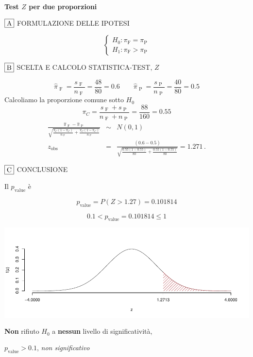 \documentclass[
  11pt,
]{book}
\theoremstyle{mytheoremstyle}
\theoremstyle{mydefstyle}
\newenvironment{sol}
  {
  \begin{tcolorbox}[enhanced,breakable,arc=0.1mm,boxrule=1pt,colback=white,colframe=iblue,
  title=\bf \fontfamily{lmss}\selectfont \hspace{.5 cm} Soluzione,drop fuzzy shadow]

}{
\end{tcolorbox}
  }
\begin{document}
\begin{sol}
\textbf{Test \(Z\) per due proporzioni}

\(\fbox{A}\) FORMULAZIONE DELLE IPOTESI

\[\begin{cases}
   H_0: \pi_\text{F} = \pi_\text{P} \\
   H_1: \pi_\text{F} > \pi_\text{P} 
   \end{cases}\]

\(\fbox{B}\) SCELTA E CALCOLO STATISTICA-TEST, \(Z\)

\[\hat\pi_\text{ F }=\frac{s_\text{ F }}{n_\text{ F }}=\frac{ 48 }{ 80 }= 0.6 \qquad
   \hat\pi_\text{ P }=\frac{s_\text{ P }}{n_\text{ P }}=\frac{ 40 }{ 80 }= 0.5 \]Calcoliamo la proporzione comune sotto \(H_0\)
\[
     \pi_C=\frac{s_\text{ F }+s_\text{ P }}{n_\text{ F }+n_\text{ P }}=
     \frac{ 88 }{ 160 }= 0.55 
   \]\begin{eqnarray*}
   \frac{\hat\pi_\text{ F } - \hat\pi_\text{ P }}
   {\sqrt{\frac {\pi_C(1-\pi_C)}{n_\text{ F }}+\frac {\pi_C(1-\pi_C)}{n_\text{ P }}}}&\sim&N(0,1)\\
   z_{\text{obs}}
   &=& \frac{ ( 0.6 -  0.5 )} {\sqrt{\frac{ 0.55 (1- 0.55 )}{ 80 }+\frac{ 0.55 (1- 0.55 )}{ 80 }}}
   =   1.271 \, .
   \end{eqnarray*}

\(\fbox{C}\) CONCLUSIONE

Il \(p_{\text{value}}\) è

\[ p_{\text{value}} = P(Z>1.27)=0.101814 \]

\[
 0.1 < p_\text{value}= 0.101814 \leq 1 
\]

\begin{center}\includegraphics{Esami_passati_con_soluzioni_files/figure-latex/2023-102,-1} \end{center}

\textbf{Non} rifiuto \(H_0\) a \textbf{nessun}
livello di significatività,

\(p_\text{value}>0.1\),
\emph{non significativo}

\end{sol}
\end{document}
